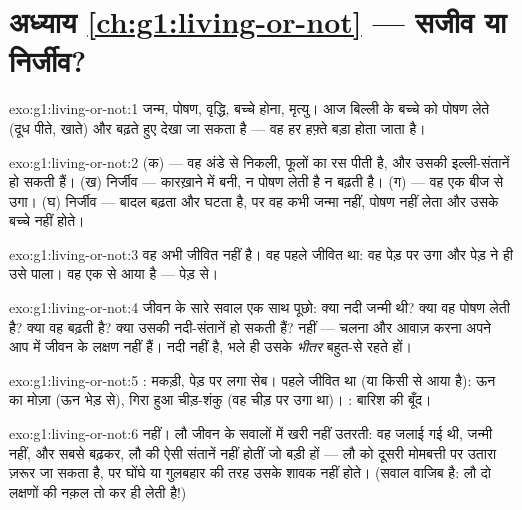 \section*{अध्याय \ref{ch:g1:living-or-not} --- सजीव या निर्जीव?}

\begin{solution}{exo:g1:living-or-not:1}
जन्म, पोषण, वृद्धि, बच्चे होना, मृत्यु। आज बिल्ली के बच्चे को पोषण
लेते (दूध पीते, खाते) और बढ़ते हुए देखा जा सकता है --- वह हर हफ़्ते
बड़ा होता जाता है।
\end{solution}

\begin{solution}{exo:g1:living-or-not:2}
(क)  --- वह अंडे से निकली, फूलों का रस पीती है, और उसकी
इल्ली-संतानें हो सकती हैं। (ख) निर्जीव --- कारख़ाने में बनी, न पोषण
लेती है न बढ़ती है। (ग)  --- वह एक बीज से उगा। (घ) निर्जीव ---
बादल बढ़ता और घटता है, पर वह कभी जन्मा नहीं, पोषण नहीं लेता और उसके
बच्चे नहीं होते।
\end{solution}

\begin{solution}{exo:g1:living-or-not:3}
वह अभी जीवित नहीं है। वह पहले जीवित था: वह पेड़ पर उगा और पेड़ ने ही
उसे पाला। वह एक  से आया है --- पेड़ से।
\end{solution}

\begin{solution}{exo:g1:living-or-not:4}
जीवन के सारे सवाल एक साथ पूछो: क्या नदी जन्मी थी? क्या वह पोषण लेती
है? क्या वह बढ़ती है? क्या उसकी नदी-संतानें हो सकती हैं? नहीं ---
चलना और आवाज़ करना अपने आप में जीवन के लक्षण नहीं हैं। नदी  नहीं
है, भले ही उसके \emph{भीतर} बहुत-से  रहते हों।
\end{solution}

\begin{solution}{exo:g1:living-or-not:5}
: मकड़ी, पेड़ पर लगा सेब। पहले जीवित था (या किसी  से आया है):
ऊन का मोज़ा (ऊन भेड़ से), गिरा हुआ चीड़-शंकु (वह चीड़ पर उगा था)। : बारिश की बूँद।
\end{solution}

\begin{solution}{exo:g1:living-or-not:6}
नहीं। लौ जीवन के सवालों में खरी नहीं उतरती: वह जलाई गई थी, जन्मी
नहीं, और सबसे बढ़कर, लौ की ऐसी संतानें नहीं होतीं जो बड़ी हों --- लौ
को दूसरी मोमबत्ती पर उतारा ज़रूर जा सकता है, पर घोंघे या गुलबहार की
तरह उसके शावक नहीं होते। (सवाल वाजिब है: लौ दो लक्षणों की नक़ल तो कर
ही लेती है!)
\end{solution}

